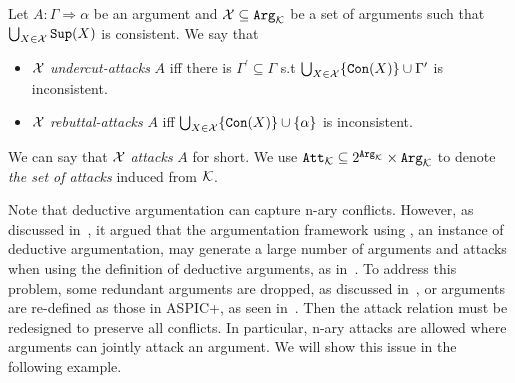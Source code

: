  
\begin{definition} 
\label{def:ab-att} 
Let $A: \Gamma \Rightarrow \alpha$ be an argument and $\mathcal{X} \subseteq \texttt{\textup{Arg}}_{\mathcal{K}}$ be a set of arguments such that $\bigcup_{X \in \mathcal{X}}\texttt{\textup{Sup}}(X)$ is consistent. We say that
    \begin{itemize}
        \item $\mathcal{X}$ \emph{undercut-attacks} $A$ iff there is $\Gamma^{\prime} \subseteq \Gamma$ s.t $\bigcup_{X \in \mathcal{X}} \{ \texttt{\textup{Con}}(X)\} \cup \Gamma^{\prime}$ is inconsistent.
        \item $\mathcal{X}$ \emph{rebuttal-attacks} $A$ iff $\bigcup_{X \in \mathcal{X}} \{ \texttt{\textup{Con}}(X)\} \cup \{\alpha \}$ is inconsistent.
  
    \end{itemize}
We can say that $\mathcal{X}$ \emph{attacks} $A$ for short. We use $\texttt{\textup{Att}}_{\mathcal{K}} \subseteq  2^{\texttt{\textup{Arg}}_{\mathcal{K}}} \times \texttt{\textup{Arg}}_{\mathcal{K}}$ to denote \emph{the set of attacks} induced from $ \mathcal{K}$.
\end{definition}










Note that deductive argumentation can capture n-ary conflicts. However, as discussed in~\cite{Yun2020SetsOA,yun2018}, it argued that the argumentation framework using \datalogPM, an instance of deductive argumentation, may generate a large number of arguments and attacks when using the definition of deductive arguments, as in~\cite{ARIOUA201776}. To address this problem, some redundant arguments are dropped, as discussed in~\cite{yun2018}, or arguments are re-defined as those in ASPIC+, as seen in~\cite{Yun2020SetsOA}. Then the attack relation must be redesigned to preserve all conflicts. In particular, n-ary attacks are allowed where arguments can jointly attack an argument. We will show this issue in the following example.  


